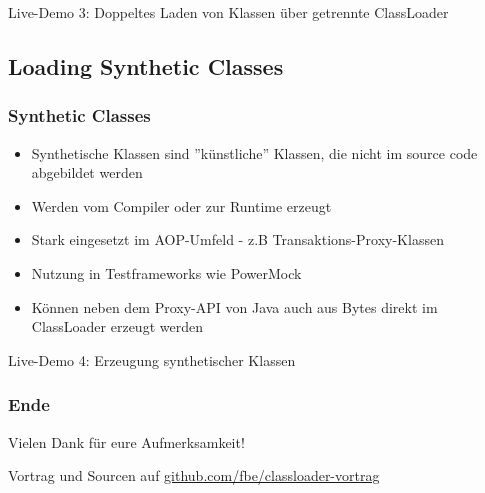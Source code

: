 \documentclass[aspectratio=169]{beamer}
\begin{document}
	\begin{frame}
		Live-Demo 3: Doppeltes Laden von Klassen über getrennte ClassLoader
	\end{frame}

	\subsection{Loading Synthetic Classes}

	\begin{frame}
		\frametitle{Synthetic Classes}
		\begin{itemize}
			\item{Synthetische Klassen sind ''künstliche'' Klassen, die nicht im source code abgebildet werden}
			\item{Werden vom Compiler oder zur Runtime erzeugt}
			\item{Stark eingesetzt im AOP-Umfeld - z.B Transaktions-Proxy-Klassen}
			\item{Nutzung in Testframeworks wie PowerMock}
			\item{Können neben dem Proxy-API von Java auch aus Bytes direkt im ClassLoader erzeugt werden}
		\end{itemize}
	\end{frame}

	\begin{frame}
		Live-Demo 4: Erzeugung synthetischer Klassen
	\end{frame}

	
	\begin{frame}
		\frametitle{Ende}
		
		\begin{center}
			Vielen Dank für eure Aufmerksamkeit!
			\par
			Vortrag und Sourcen auf \href{https://github.com/fbe/classloader-vortrag}{github.com/fbe/classloader-vortrag}
		\end{center}

	\end{frame}
\end{document}
